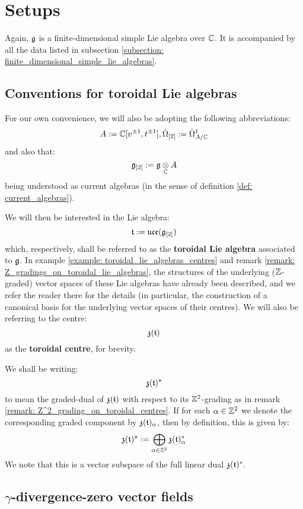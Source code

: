 \section{Setups}
    Again, $\mathfrak{g}$ is a finite-dimensional simple Lie algebra over $\mathbb{C}$. It is accompanied by all the data listed in subsection \ref{subsection: finite_dimensional_simple_lie_algebras}. 

    \subsection{Conventions for toroidal Lie algebras} \label{subsection: toroidal_lie_algebra_conventions}
        For our own convenience, we will also be adopting the following abbreviations:
            $$A := \mathbb{C}[v^{\pm 1}, t^{\pm 1}], \bar{\Omega}_{[2]} := \bar{\Omega}^1_{A/\mathbb{C}}$$
        and also that:
            $$\g_{[2]} := \g \tensor_{\bbC} A$$
        being understood as current algebras (in the sense of definition \ref{def: current_algebras}).
    
        We will then be interested in the Lie algebra:
            $$\mathfrak{t} := \mathfrak{uce}(\mathfrak{g}_{[2]})$$
        which, respectively, shall be referred to as the \textbf{toroidal Lie algebra} associated to $\mathfrak{g}$. In example \ref{example: toroidal_lie_algebras_centres} and remark \ref{remark: Z_gradings_on_toroidal_lie_algebras}, the structures of the underlying ($\mathbb{Z}$-graded) vector spaces of these Lie algebras have already been described, and we refer the reader there for the details (in particular, the construction of a canonical basis for the underlying vector spaces of their centres). We will also be referring to the centre:
            $$\mathfrak{z}(\mathfrak{t})$$
        as the \textbf{toroidal centre}, for brevity.

        We shall be writing:
            $$\mathfrak{z}(\mathfrak{t})^{\star}$$
        to mean the graded-dual of $\mathfrak{z}(\mathfrak{t})$ with respect to its $\mathbb{Z}^2$-grading as in remark \ref{remark: Z^2_grading_on_toroidal_centres}. If for each $\alpha \in \mathbb{Z}^2$ we denote the corresponding graded component by $\mathfrak{z}(\mathfrak{t})_{\alpha}$, then by definition, this is given by:
            $$\mathfrak{z}(\mathfrak{t})^{\star} := \bigoplus_{\alpha \in \mathbb{Z}^2} \mathfrak{z}(\mathfrak{t})_{\alpha}^*$$
        We note that this is a vector subspace of the full linear dual $\mathfrak{z}(\mathfrak{t})^*$.
    
    \subsection{\texorpdfstring{$\gamma$}{}-divergence-zero vector fields} \label{subsection: yangian_div_zero_vector_fields}
    
